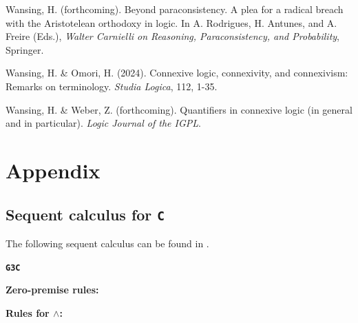 \documentclass{article}%
\theoremstyle{break}
\begin{document}
\begin{thebibliography}{}
 Wansing, H. (forthcoming). Beyond paraconsistency. A plea for a radical breach with the Aristotelean orthodoxy in logic. In A. Rodrigues, H. Antunes, and A. Freire (Eds.), {\em Walter Carnielli on Reasoning, Paraconsistency, and Probability}, Springer.


 Wansing, H. \& Omori, H. (2024).  Connexive logic, connexivity, and connexivism: Remarks on terminology. {\em Studia Logica}, 112, 1-35.

 Wansing, H. \& Weber, Z. (forthcoming). Quantifiers in connexive logic (in general and in particular). {\em Logic Journal of the IGPL}. 


\end{thebibliography}

\appendix
\section*{Appendix}



\subsection*{Sequent calculus for \texttt{C}}

The following sequent calculus can be found in \cite[p. 516]{OmoriWansing2020}.
\vspace{0.5cm}

{\Large \textbf{\texttt{G3C}}} 


\vspace{0.2cm}


\textbf{Zero-premise rules:}

\vspace{0.2cm}

\quad 
{}
\quad \quad
{}

\vspace{0.2cm}


\textbf{Rules for $\wedge$:}

\vspace{0.2cm}
\quad   
{}
\quad  \quad
{}


\vspace{0.2cm}
\end{document}
